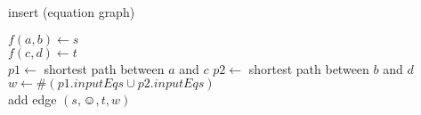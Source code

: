 \begin{algorithm}[h]
\caption[.]{insert (equation graph)}
	
	{
		$f(a,b) \leftarrow s$ \\
		$f(c,d) \leftarrow t$ \\
		$p1 \leftarrow $ shortest path between $a$ and $c$%
		$p2 \leftarrow $ shortest path between $b$ and $d$%
		$w \leftarrow \#(p1.inputEqs \cup p2.inputEqs) $ \\
		add edge $(s,\smiley,t,w)$ %
	}
  
  \label{algo:insert_dij}
\end{algorithm}
